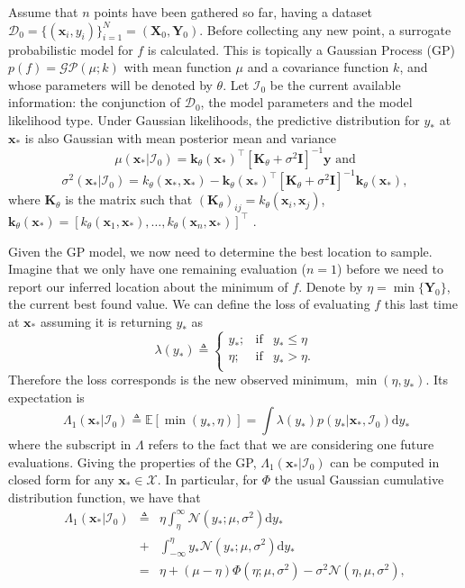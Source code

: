 \documentclass[twoside]{article}
\newcommand{\I}{\mathcal{I}}
\newcommand{\ud}{\mathrm{d}}
\newcommand{\E}{\mathbb{E}}
\newcommand{\bx}{\textbf{x}}
\newcommand{\bX}{\textbf{X}}
\newcommand{\bY}{\textbf{Y}}
\newcommand{\by}{\textbf{y}}
\newcommand{\bk}{\textbf{k}}
\newcommand{\bK}{\textbf{K}}
\newcommand{\data}{\mathcal{D}}
\begin{document}
Assume that $n$ points have been gathered so far, having a dataset $\data_0 = \{(\bx_i,y_i)\}_{i=1}^N = (\bX_0,\bY_0)$. Before collecting any new point, a surrogate probabilistic model for $f$ is calculated. This is topically a Gaussian Process (GP) $p(f) = \mathcal{GP}(\mu; k)$ with mean function $\mu$ and a covariance function $k$, and whose parameters will be denoted by $\theta$.  Let $\I_0$ be the current available information: the conjunction of $\data_0$, the model parameters and the model likelihood type.  Under Gaussian likelihoods, the predictive distribution for $y_*$ at $\bx_*$ is also Gaussian with mean posterior mean and variance
$$\mu(\bx_{*}|\I_0) = \bk_{\theta}(\bx_*)^\top[\bK_{\theta} + \sigma^2 \textbf{I}]^{-1}\by \mbox{ and}$$
$$\sigma^2(\bx_*|\I_0)=k_{\theta}(\bx_*,\bx_*)-\bk_{\theta}(\bx_*)^\top[\bK_{\theta}+\sigma^2 \textbf{I}]^{-1}\bk_{\theta}(\bx_*),$$
where $\bK_{\theta}$ is the matrix such that $(\bK_{\theta})_{ij}=k_{\theta}(\bx_i,\bx_j)$,  $\bk_{\theta}(\bx_{*}) = [k_{\theta}(\bx_1,\bx_{*}),\dots,k_{\theta}(\bx_n,\bx_{*})]^\top$ \citep{Rasmussen:2005:GPM:1162254}.  


Given the GP model, we now need to determine the best location to sample. Imagine that we only have one remaining evaluation ($n=1$) before we need to report our inferred location about the minimum of $f$. Denote by $\eta = \min \{\bY_0\}$, the current best found value. We can define the loss of evaluating $f$ this last time at $\bx_*$ assuming it is returning $y_*$ as
$$\lambda(y_*)\triangleq \left\{ \begin{array}{lcl}
y_*;             & \mbox{if}  &  y_* \leq \eta \\
 \eta; & \mbox{if}  & y_* > \eta. \\
\end{array}
\right.$$
Therefore the loss corresponds is the new observed minimum, $\min (\eta,y_*)$. Its expectation is 
$$\ \Lambda_1(\bx_*| \I_0) \triangleq \E[ \min (y_*,\eta)]= \int \lambda(y_*)p(y_* |\bx_*,\I_0)\ud y_*$$
where the subscript in $\Lambda$ refers to the fact that we are considering one future evaluations.  Giving the properties of the GP, $\Lambda_1(\bx_*| \I_0)$ can be computed in closed form for any $\bx_* \in \mathcal{X}$. In particular, for $\Phi$ the usual Gaussian cumulative distribution function, we have that
\begin{eqnarray}\label{eq:expected_myopic_loss}
\Lambda_1(\bx_*| \I_0) &  \triangleq & \eta \int_{\eta}^{\infty} \mathcal{N}(y_*;\mu,\sigma^2) \ud y_* \\ \nonumber
& +  & \int_{-\infty}^{\eta} y_* \mathcal{N}(y_*;\mu,\sigma^2) \ud y_*  \\ \nonumber
& = &  \eta +(\mu  - \eta) \Phi (\eta ; \mu, \sigma^2) - \sigma^2 \mathcal{N} (\eta, \mu, \sigma^2), \nonumber
\end{eqnarray}
\end{document}
